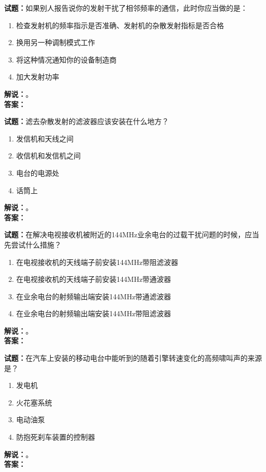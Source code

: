 \documentclass{ctexbook}
\begin{document}
\bigskip

\noindent\textbf{试题：}如果别人报告说你的发射干扰了相邻频率的通信，此时你应当做的是：
\begin{enumerate}[leftmargin=3em]
  \item 检查发射机的频率指示是否准确、发射机的杂散发射指标是否合格
  \item 换用另一种调制模式工作
  \item 将这种情况通知你的设备制造商
  \item 加大发射功率
\end{enumerate}
\noindent\textbf{解说：}\textbf{}。\\\noindent\textbf{答案：}

\bigskip

\noindent\textbf{试题：}滤去杂散发射的滤波器应该安装在什么地方？
\begin{enumerate}[leftmargin=3em]
  \item 发信机和天线之间
  \item 收信机和发信机之间
  \item 电台的电源处
  \item 话筒上
\end{enumerate}
\noindent\textbf{解说：}\textbf{}。\\\noindent\textbf{答案：}

\bigskip

\noindent\textbf{试题：}在解决电视接收机被附近的144\unit{\MHz}业余电台的过载干扰问题的时候，应当先尝试什么措施？
\begin{enumerate}[leftmargin=3em]
  \item 在电视接收机的天线端子前安装144\unit{\MHz}带阻滤波器
  \item 在电视接收机的天线端子前安装144\unit{\MHz}带通波器
  \item 在业余电台的射频输出端安装144\unit{\MHz}带通滤波器
  \item 在业余电台的射频输出端安装144\unit{\MHz}带阻滤波器
\end{enumerate}
\noindent\textbf{解说：}\textbf{}。\\\noindent\textbf{答案：}

\bigskip

\noindent\textbf{试题：}在汽车上安装的移动电台中能听到的随着引擎转速变化的高频啸叫声的来源是？
\begin{enumerate}[leftmargin=3em]
  \item 发电机
  \item 火花塞系统
  \item 电动油泵
  \item 防抱死刹车装置的控制器
\end{enumerate}
\noindent\textbf{解说：}\textbf{}。\\\noindent\textbf{答案：}
\end{document}
